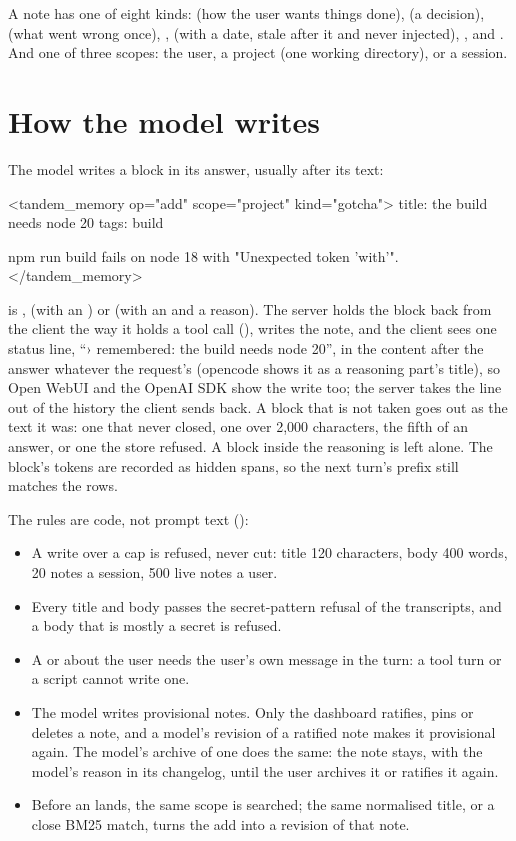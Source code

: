 A note has one of eight kinds:  (how the user wants things done),  (a decision),  (what went wrong once), ,  (with a  date, stale after it and never injected), ,  and . And one of three scopes: the user, a project (one working directory), or a session.

\section{How the model writes}

The model writes a block in its answer, usually after its text:

\begin{plain}
<tandem_memory op="add" scope="project" kind="gotcha">
title: the build needs node 20
tags: build

npm run build fails on node 18 with "Unexpected token 'with'".
</tandem_memory>
\end{plain}

 is ,  (with an ) or  (with an  and a reason). The server holds the block back from the client the way it holds a tool call (), writes the note, and the client sees one status line, \enquote{› remembered: the build needs node 20}, in the content after the answer whatever the request's  (opencode shows it as a reasoning part's title), so Open WebUI and the OpenAI SDK show the write too; the server takes the line out of the history the client sends back. A block that is not taken goes out as the text it was: one that never closed, one over 2,000 characters, the fifth of an answer, or one the store refused. A block inside the reasoning is left alone. The block's tokens are recorded as hidden spans, so the next turn's prefix still matches the rows.

The rules are code, not prompt text ():

\begin{itemize}
\item A write over a cap is refused, never cut: title 120 characters, body 400 words, 20 notes a session, 500 live notes a user.
\item Every title and body passes the secret-pattern refusal of the transcripts, and a body that is mostly a secret is refused.
\item A  or  about the user needs the user's own message in the turn: a tool turn or a script cannot write one.
\item The model writes provisional notes. Only the dashboard ratifies, pins or deletes a note, and a model's revision of a ratified note makes it provisional again. The model's archive of one does the same: the note stays, with the model's reason in its changelog, until the user archives it or ratifies it again.
\item Before an  lands, the same scope is searched; the same normalised title, or a close BM25 match, turns the add into a revision of that note.
\end{itemize}

